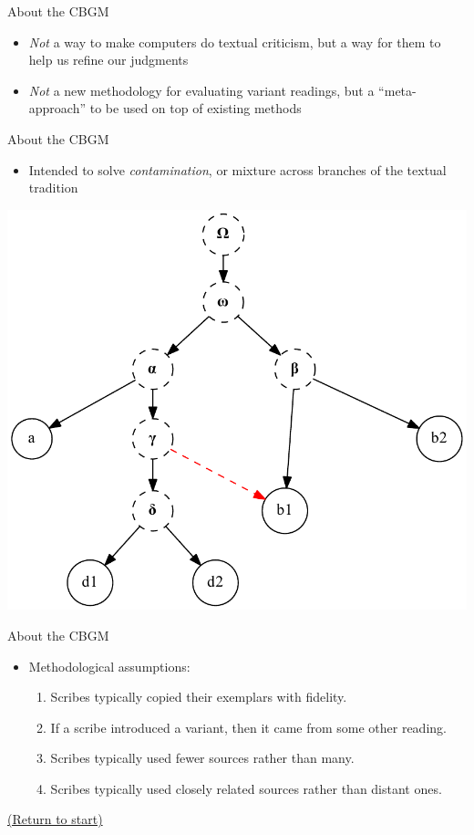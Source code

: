 \documentclass[10pt]{beamer}
\begin{document}
	\begin{frame}{About the CBGM}
		\begin{itemize}
			\item \emph{Not} a way to make computers do textual criticism, but a way for them to help us refine our judgments
			\item \emph{Not} a new methodology for evaluating variant readings, but a ``meta-approach'' to be used on top of existing methods
		\end{itemize}
	\end{frame}
	\begin{frame}{About the CBGM}
		\begin{itemize}
			\item Intended to solve \emph{contamination}, or mixture across branches of the textual tradition
		\end{itemize}
		\begin{center}
			\includegraphics[scale=0.5]{../graphics/stemma-contamination.pdf}
		\end{center}
	\end{frame}
	\begin{frame}{About the CBGM}
		\begin{itemize}
			\item Methodological assumptions:
			\begin{enumerate}
				\item Scribes typically copied their exemplars with fidelity.
				\item If a scribe introduced a variant, then it came from some other reading.
				\item Scribes typically used fewer sources rather than many.
				\item Scribes typically used closely related sources rather than distant ones.
			\end{enumerate}
		\end{itemize}
		\begin{center}
			\hyperlink{slide:crossroad}{(Return to start)}
		\end{center}
	\end{frame}
\end{document}
